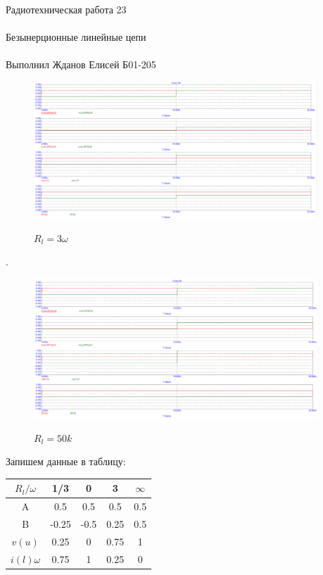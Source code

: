 \documentclass{astroedu-lab}
\begin{document}
\begin{problem}{\huge Радиотехническая работа 23\\\\Безынерционные линейные цепи\\\\Выполнил Жданов Елисей Б01-205}
\newpage

\begin{figure}[h!]
\centering
\includegraphics[width=0.95\textwidth]{картинки/Graph6.png}
\label{fig:Image1}
\caption{$R_l = 3\omega$}
\end{figure}

.

\begin{figure}[h!]
\centering
\includegraphics[width=0.95\textwidth]{картинки/Graph7.png}
\label{fig:Image1}
\caption{$R_l = 50k$}
\end{figure}

\newpage

Запишем данные в таблицу:

\begin{center}
\begin{tabular}{|c|c|c|c|c|}
\hline 
$R_l/\omega$ & 1/3 & 0 & 3 & $\infty$ \\ 
\hline 
A & 0.5 & 0.5 & 0.5 & 0.5 \\ 
\hline 
B & -0.25 & -0.5 & 0.25 & 0.5 \\ 
\hline 
$v(u)$ & 0.25 & 0 & 0.75 & 1 \\ 
\hline 
$i(l)\omega$ & 0.75 & 1 & 0.25 & 0 \\ 
\hline 
\end{tabular} 
\end{center}


\end{problem}
\end{document}
